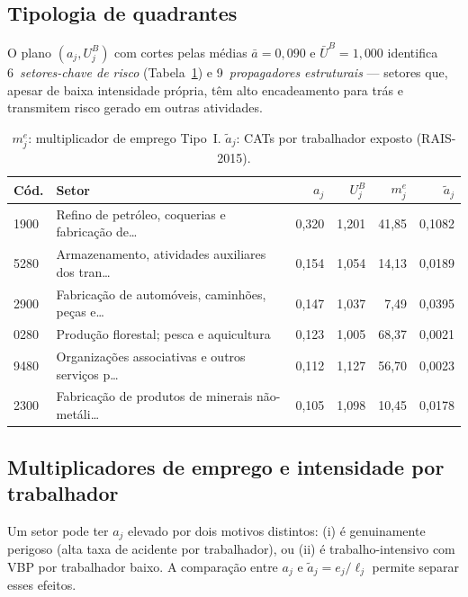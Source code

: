 \documentclass[12pt, a4paper]{article}
\begin{document}
  \subsection{Tipologia de quadrantes}

  O plano $(a_j, U_j^B)$ com cortes pelas médias
  $\bar{a} = 0{,}090$ e $\bar{U}^B = 1{,}000$
  identifica 6~\textit{setores-chave de risco}
  (Tabela~\ref{tab:chave}) e 9~\textit{propagadores estruturais}
  --- setores que, apesar de baixa intensidade própria, têm alto
  encadeamento para trás e transmitem risco gerado em outras atividades.

  \begin{table}[H]
  \centering
  \small
  \caption{Setores-chave de risco (alta $a_j$ e alto $U_j^B$), MIP-ES 2015}
  \label{tab:chave}
  \begin{tabular}{lp{5.2cm}rrrr}
  \toprule
  \textbf{Cód.} & \textbf{Setor} & $a_j$ & $U_j^B$ & $m^e_j$ & $\tilde{a}_j$ \\
  \midrule
    1900 & Refino de petróleo, coquerias e fabricação de\ldots & 0{,}320 & 1{,}201 & 41{,}85 & 0{,}1082 \\
5280 & Armazenamento, atividades auxiliares dos tran\ldots & 0{,}154 & 1{,}054 & 14{,}13 & 0{,}0189 \\
2900 & Fabricação de automóveis, caminhões, peças e\ldots & 0{,}147 & 1{,}037 & 7{,}49 & 0{,}0395 \\
0280 & Produção florestal; pesca e aquicultura & 0{,}123 & 1{,}005 & 68{,}37 & 0{,}0021 \\
9480 & Organizações associativas e outros serviços p\ldots & 0{,}112 & 1{,}127 & 56{,}70 & 0{,}0023 \\
2300 & Fabricação de produtos de minerais não-metáli\ldots & 0{,}105 & 1{,}098 & 10{,}45 & 0{,}0178 \\
  \bottomrule
  \end{tabular}
  \caption*{\footnotesize $m^e_j$: multiplicador de emprego Tipo~I.
  $\tilde{a}_j$: CATs por trabalhador exposto (RAIS-2015).}
  \end{table}

  \subsection{Multiplicadores de emprego e intensidade por trabalhador}
  \label{sec:emprego}

  Um setor pode ter $a_j$ elevado por dois motivos distintos: (i) é
  genuinamente perigoso (alta taxa de acidente por trabalhador), ou
  (ii) é trabalho-intensivo com VBP por trabalhador baixo. A comparação
  entre $a_j$ e $\tilde{a}_j = e_j/\ell_j$ permite separar esses
  efeitos.
\end{document}
